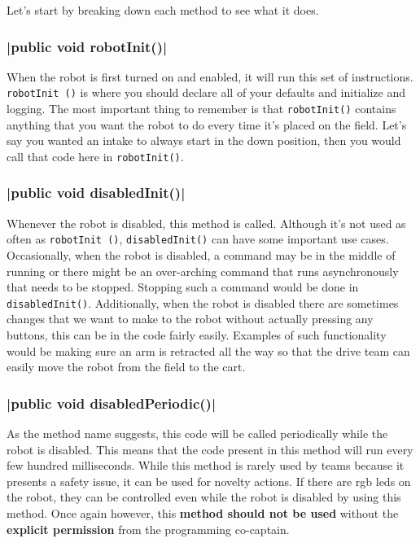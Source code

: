 \documentclass[11pt,fleqn]{article}
\begin{document}
Let's start by breaking down each method to see what it does.

\subsubsection{|public void robotInit()|}
When the robot is first turned on and enabled, it will run this set of instructions. \texttt{robotInit
()} is where you should declare all of your defaults and initialize and logging. The most important thing
to remember is that \texttt{robotInit()} contains anything that you want the robot to do every time it's
placed on the field. Let's say you wanted an intake to always start in the down position, then you would
call that code here in \texttt{robotInit()}.

\subsubsection{|public void disabledInit()|}
Whenever the robot is disabled, this method is called. Although it's not used as often as \texttt{robotInit
()}, \texttt{disabledInit()} can have some important use cases. Occasionally, when the robot is disabled,
a command may be in the middle of running or there might be an over-arching command that runs asynchronously
that needs to be stopped. Stopping such a command would be done in \texttt{disabledInit()}. Additionally,
when the robot is disabled there are sometimes changes that we want to make to the robot without actually
pressing any buttons, this can be in the code fairly easily. Examples of such functionality would be making
sure an arm is retracted all the way so that the drive team can easily move the robot from the field to
the cart.

\subsubsection{|public void disabledPeriodic()|}
As the method name suggests, this code will be called periodically while the robot is disabled. This means
that the code present in this method will run every few hundred milliseconds. While this method is rarely
used by teams because it presents a safety issue, it can be used for novelty actions. If there are rgb
leds on the robot, they can be controlled even while the robot is disabled by using this method. Once
again however, this \textbf{method should not be used} without the \textbf{explicit permission}
from the programming co-captain.
\end{document}
